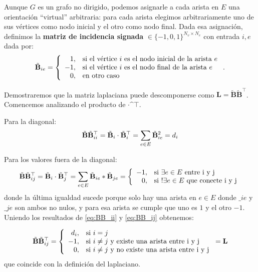 \documentclass{article}
\begin{document}
Aunque $G$ es un grafo no dirigido, podemos asignarle a cada arista en $E$ una orientación ``virtual'' arbitraria: para cada arista elegimos arbitrariamente uno de sus vértices como nodo inicial y el otro como nodo final. Dada esa asignación, definimos la \textbf{matriz de incidencia signada} $\bm \in \{-1,0,1\}^{N_v\times N_e}$ con entrada $i,e$ dada por:
\begin{equation}
    \tilde{\mathbf{B}}_{ie} = \left\lbrace
    \begin{array}{r l}
    1,& \text{si el vértice } i \text{ es el nodo inicial de la arista } e\\
    -1,& \text{si el vértice } i \text{ es el nodo final de la arista } e\\
    0,& \text{en otro caso}
    \end{array}
    \right. .
    \label{eq:matrix_incidencia}
\end{equation}

Demostraremos que la matriz laplaciana puede descomponerse como $\mathbf{L}=\tilde{\mathbf{B}}\tilde{\mathbf{B}}^\top$. Comencemos analizando el producto de $\bm\cdot\bm^\top$.

Para la diagonal:
\begin{equation}
    \label{eq:BB_ii}
    \tilde{\mathbf{B}}\tilde{\mathbf{B}}^\top_{ii} = \tilde{\mathbf{B}}_i \cdot \tilde{\mathbf{B}}_i^\top = \sum_{e\in E} \tilde{\mathbf{B}}_{ie}^2 = d_i
\end{equation}

Para los valores fuera de la diagonal:
\begin{equation}
    \label{eq:BB_ij}
    \tilde{\mathbf{B}}\tilde{\mathbf{B}}^\top_{ij} = \tilde{\mathbf{B}}_i\cdot\tilde{\mathbf{B}}_j^\top = \sum_{e\in E} \tilde{\mathbf{B}}_{ie} * \tilde{\mathbf{B}}_{je} = \left\lbrace
    \begin{array}{r l}
       -1, & \text{si $\exists e\in E$ entre i y j} \\
       0, & \text{si $!\exists e \in E$ que conecte i y j}
    \end{array}
    \right.
\end{equation}
donde la última igualdad sucede porque solo hay una arista en $e \in E$ donde 
$\bm_{ie}$ y $\bm_{je}$ son ambos no nulos, y para esa arista se cumple que uno es 
$1$ y el otro $-1$. Uniendo los resultados de \eqref{eq:BB_ii} y \eqref{eq:BB_ij} obtenemos:

\begin{equation}
    \label{eq:L_igual_BB}
   \tilde{\mathbf{B}}\tilde{\mathbf{B}}^\top_{ij} = \left\lbrace
   \begin{array}{r l}
        d_i, & \text{si $i=j$} \\
        -1, & \text{si $i\neq j$ y existe una arista entre i y j} \\
        0, & \text{si $i\neq j$ y no existe una arista entre i y j}
   \end{array}
   \right. = \mathbf{L}
\end{equation}
que coincide con la definición del laplaciano.
\end{document}
